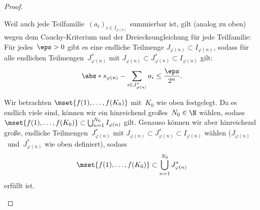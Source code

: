 \documentclass[a4paper]{article}
\begin{document}
\begin{proof}
\begin{enumerate}
              Weil auch jede Teilfamilie~$(a_i)_{i\in I_{\varphi(n)}}$ summierbar ist, gilt (analog zu oben) wegen dem Cauchy-Kriterium und der Dreiecksungleichung für jede Teilfamilie: Für jedes~$\eps > 0$ gibt es eine endliche Teilmenge $J_{\varphi(n)} \subset I_{\varphi(n)}$, sodass für alle endlichen Teilmengen~$J^*_{\varphi(n)}$ mit $J_{\varphi(n)} \subset J^*_{\varphi(n)} \subset I_{\varphi(n)}$ gilt:
              \begin{equation*}
                  \abs*{s_{\varphi(n)} - \sum_{i\in J^*_{\varphi(n)}} a_i} \leq \frac{\eps}{2^n}.
              \end{equation*}

              Wir betrachten $\mset{f(1),\dots,f(K_0)}$ mit~$K_0$ wie oben festgelegt. Da es endlich viele sind, können wir ein hinreichend großes~$N_0 \in \N$ wählen, sodass $\mset{f(1),\dots,f(K_0)} \subset \bigcup_{n=1}^{N_0} I_{\varphi(n)}$ gilt. Genauso können wir aber hinreichend große, endliche Teilmengen~$J^*_{\varphi(n)}$ mit $J_{\varphi(n)} \subset J^*_{\varphi(n)} \subset I_{\varphi(n)}$ wählen ($J_{\varphi(n)}$~und~$J^*_{\varphi(n)}$ wie oben definiert), sodass
              \begin{equation}
                  \mset{f(1),\dots,f(K_0)} \subset \bigcup_{n=1}^{N_0} J^*_{\varphi(n)} \label{eqn:bigrearrangement:finite}
              \end{equation}
              erfüllt ist.
              

\end{enumerate}
\end{proof}
\end{document}
